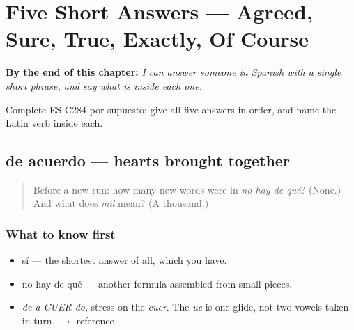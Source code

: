 
\chapter{Five Short Answers --- Agreed, Sure, True, Exactly, Of Course}
\label{ch:respuestas-cortas}

\begin{chapteropening}
\textbf{By the end of this chapter:} \emph{I can answer someone in Spanish with a single short phrase, and say what is inside each one.}

Complete ES-C284-por-supuesto: give all five answers in order, and name the Latin verb inside each.
\end{chapteropening}

\section[de acuerdo]{de acuerdo — hearts brought together}

\label{lesson:ES-C284-de-acuerdo}



\begin{quote}
Before a new run: how many new words were in \emph{no hay de qué}? (None.) And what does \emph{mil} mean? (A thousand.)
\end{quote}

\subsection*{What to know first}
\begin{itemize}
\raggedright
  \item sí — the shortest answer of all, which you have.
  \item no hay de qué — another formula assembled from small pieces.
\end{itemize}

\begin{sounds}
\begin{itemize}
\raggedright
  \item \emph{de a-CUER-do}, stress on the \emph{cuer}. The \emph{ue} is one glide, not two vowels taken in turn. $\to$ reference
\end{itemize}
\end{sounds}


